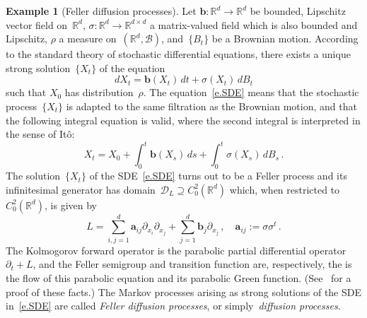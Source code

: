 \documentclass[11pt]{article} %
\numberwithin{equation}{section}
\theoremstyle{definition}
\newtheorem{example}[theorem]{Example}
\newcommand*{\R}{\ensuremath{\mathbb{R}}}
\newcommand*{\Rd}{\ensuremath{\mathbb{R}^d}}
\renewcommand{\b}{\ensuremath{\mathbf{b}}}
\renewcommand{\a}{\mathbf{a}}
\begin{document}
\begin{example}[Feller diffusion processes]
Let $\b: \Rd \to \Rd$ be bounded, Lipschitz vector field on~$\Rd$, $\sigma:\Rd \to \R^{d\times d}$ a matrix-valued field which is also bounded and Lipschitz, $\rho$ a measure on~$(\Rd,\mathscr{B})$, and~$\{B_t\}$ be a Brownian motion. 
According to the standard theory of stochastic differential equations, 
there exists a unique strong solution~$\{X_t\}$ of the equation
\begin{equation}
\label{e.SDE}
dX_t = \b(X_t) \, dt + \sigma(X_t) \, dB_t
\end{equation}
such that $X_0$ has distribution~$\rho$. 
The equation~\eqref{e.SDE} means that the stochastic process~$\{ X_t\}$ is adapted to the same filtration as the Brownian motion, and that the following integral equation is valid, where the second integral is interpreted in the sense of It\^o:
\begin{equation}
\label{e.SDE.Ito}
X_t = X_0 + \int_0^t \b(X_s) \, ds + \int_0^t \sigma(X_s) \, dB_s\,. 
\end{equation}
The solution~$\{ X_t\}$ of the SDE~\eqref{e.SDE} turns out to be a Feller process and its infinitesimal generator has domain~$\mathscr{D}_L \supseteq C^2_0(\Rd) $ which, when restricted to~$C^2_0(\Rd) $, is given by 
\begin{equation}
\label{e.L.nondivform}
L = 
\sum_{i,j=1}^d \a_{ij} \partial_{x_i} \partial_{x_j} 
+
\sum_{j=1}^d \b_j \partial_{x_j} 
\,, \quad \a_{ij} := \sigma\sigma^t\,.
\end{equation}
The Kolmogorov forward operator is the parabolic partial differential operator~$\partial_t + L$, and the Feller semigroup and transition function are, respectively, the is the flow of this parabolic equation and its parabolic Green function. (See~\cite[IX.2]{RY} for a proof of these facts.)
The Markov processes arising as strong solutions of the SDE in~\eqref{e.SDE} are called \emph{Feller diffusion processes}, or simply~\emph{diffusion processes}. 
\end{example}
\end{document}
